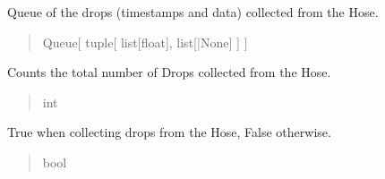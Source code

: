 \documentclass[letterpaper,10pt,english]{sphinxmanual}
\begin{document}
\begin{fulllineitems}
\begin{fulllineitems}
\label{\detokenize{PodApi.Stream.Collect:PodApi.Stream.Collect.DataBucket.Bucket.drops}}
\pysigstartsignatures
{}
\pysigstopsignatures
\sphinxAtStartPar
Queue of the drops             (timestamps and data) collected from the Hose.
\begin{quote}\begin{description}
\sphinxAtStartPar
Queue{[} tuple{[} list{[}float{]}, list{[}{\hyperref[\detokenize{PodApi.Packets:PodApi.Packets.Packet.Packet}]{}}|None{]} {]} {]}

\end{description}\end{quote}

\end{fulllineitems}


\begin{fulllineitems}
\label{\detokenize{PodApi.Stream.Collect:PodApi.Stream.Collect.DataBucket.Bucket.totalDropsCollected}}
\pysigstartsignatures
{}
\pysigstopsignatures
\sphinxAtStartPar
Counts the total number of Drops collected from the Hose.
\begin{quote}\begin{description}
\sphinxAtStartPar
int

\end{description}\end{quote}

\end{fulllineitems}


\begin{fulllineitems}
\label{\detokenize{PodApi.Stream.Collect:PodApi.Stream.Collect.DataBucket.Bucket.isCollecting}}
\pysigstartsignatures
{}
\pysigstopsignatures
\sphinxAtStartPar
True when collecting drops from the Hose, False otherwise.
\begin{quote}\begin{description}
\sphinxAtStartPar
bool


\end{description}
\end{quote}
\end{fulllineitems}
\end{fulllineitems}
\end{document}
